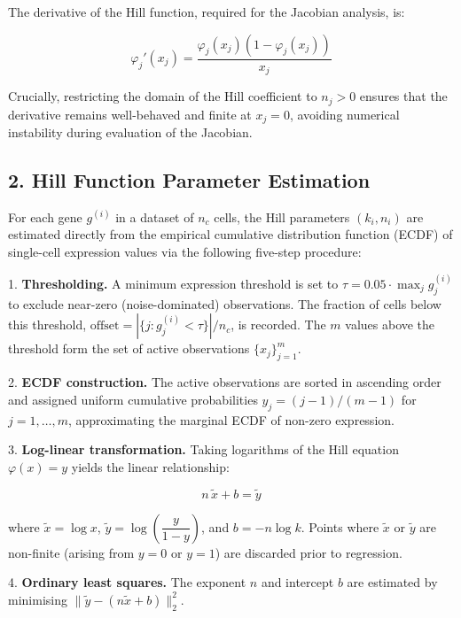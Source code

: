 \documentclass[11pt]{article}
\begin{document}
The derivative of the Hill function, required for the Jacobian analysis, is:


\begin{equation}
\varphi_j'(x_j) = \frac{\varphi_j(x_j)\left(1 - \varphi_j(x_j)\right)}{x_j} 
\end{equation}


Crucially, restricting the domain of the Hill coefficient to $n_j > 0$ ensures that the derivative remains well-behaved and finite at $x_j = 0$, avoiding numerical instability during evaluation of the Jacobian.



\subsection*{2. Hill Function Parameter Estimation}

For each gene $g^{(i)}$ in a dataset of $n_c$ cells, the Hill parameters $(k_i, n_i)$ are estimated directly from the empirical cumulative distribution function (ECDF) of single-cell expression values via the following five-step procedure:

1. \textbf{Thresholding.} A minimum expression threshold is set to $\tau = 0.05 \cdot \max_j g^{(i)}_j$ to exclude near-zero (noise-dominated) observations. The fraction of cells below this threshold, $\text{offset} = |\{j: g^{(i)}_j < \tau\}| / n_c$, is recorded. The $m$ values above the threshold form the set of active observations $\{x_j\}_{j=1}^m$.

2. \textbf{ECDF construction.} The active observations are sorted in ascending order and assigned uniform cumulative probabilities $y_j = (j-1)/(m-1)$ for $j = 1,\ldots,m$, approximating the marginal ECDF of non-zero expression.

3. \textbf{Log-linear transformation.} Taking logarithms of the Hill equation $\varphi(x) = y$ yields the linear relationship:

\begin{equation}
n\,\tilde{x} + b = \tilde{y} 
\end{equation}

where $\tilde{x} = \log x$, $\tilde{y} = \log\!\left(\dfrac{y}{1-y}\right)$, and $b = -n\log k$. Points where $\tilde{x}$ or $\tilde{y}$ are non-finite (arising from $y = 0$ or $y = 1$) are discarded prior to regression.

4. \textbf{Ordinary least squares.} The exponent $n$ and intercept $b$ are estimated by minimising $\|\tilde{y} - (n\tilde{x} + b)\|_2^2$.
\end{document}
